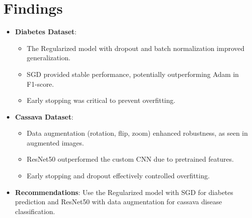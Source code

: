 \documentclass[a4paper,12pt]{article}
\begin{document}
\section*{Findings}
\begin{itemize}
    \item \textbf{Diabetes Dataset}:
    \begin{itemize}
        \item The Regularized model with dropout and batch normalization improved generalization.
        \item SGD provided stable performance, potentially outperforming Adam in F1-score.
        \item Early stopping was critical to prevent overfitting.
    \end{itemize}
    \item \textbf{Cassava Dataset}:
    \begin{itemize}
        \item Data augmentation (rotation, flip, zoom) enhanced robustness, as seen in augmented images.
        \item ResNet50 outperformed the custom CNN due to pretrained features.
        \item Early stopping and dropout effectively controlled overfitting.
    \end{itemize}
    \item \textbf{Recommendations}: Use the Regularized model with SGD for diabetes prediction and ResNet50 with data augmentation for cassava disease classification.
\end{itemize}
\end{document}
